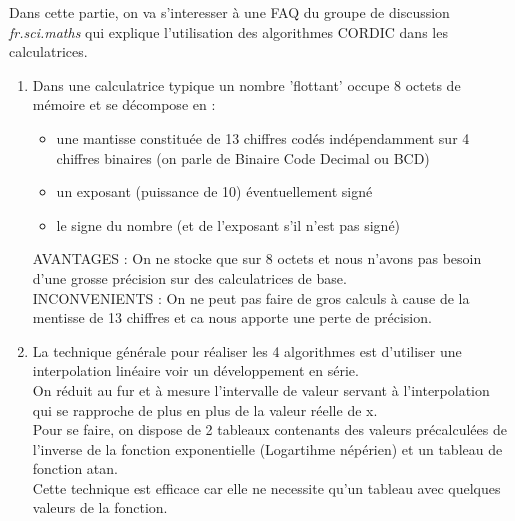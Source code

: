 \documentclass{article}
\begin{document}
Dans cette partie, on va s'interesser à une FAQ du groupe de discussion \emph{fr.sci.maths} qui explique l'utilisation des algorithmes CORDIC dans les calculatrices.
\begin{enumerate}

\item Dans une calculatrice typique un nombre 'flottant' occupe 8 octets 
  de mémoire et se décompose en : 
  \begin{itemize}
  \item une mantisse constituée de 13 chiffres codés indépendamment sur
    4 chiffres binaires (on parle de Binaire Code Decimal ou BCD) 
  \item un exposant (puissance de 10) éventuellement signé
  \item le signe du nombre (et de l'exposant s'il n'est pas signé)
\end{itemize}
    AVANTAGES : On ne stocke que sur 8 octets et nous n'avons pas besoin d'une grosse précision sur des calculatrices de base. \\
    INCONVENIENTS : On ne peut pas faire de gros calculs à cause de la mentisse de 13 chiffres et ca nous apporte une perte de précision.

\item La technique générale pour réaliser les 4 algorithmes est d'utiliser une interpolation linéaire voir un développement en série. \\
On réduit au fur et à mesure l'intervalle de valeur servant à l'interpolation qui se rapproche de plus en plus de la valeur réelle de x. \\
Pour se faire, on dispose de 2 tableaux contenants des valeurs précalculées de l'inverse de la fonction exponentielle (Logartihme népérien) et un tableau de fonction atan. \\
Cette technique est efficace car elle ne necessite qu'un tableau avec quelques valeurs de la fonction.
\end{enumerate}
\end{document}
